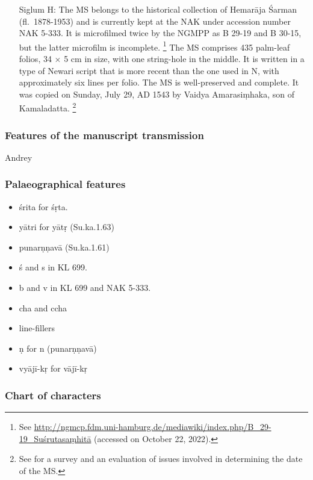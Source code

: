 \begin{itemize}
\item[Siglum H:] The MS belongs to the historical collection of Hemarāja Śarman (fl.\ 1878-1953) and is currently kept at the NAK under accession number NAK 5-333. It is microfilmed twice by the NGMPP as B 29-19 and B 30-15, but the latter microfilm is incomplete.%
    \footnote{%
    See \href{http://ngmcp.fdm.uni-hamburg.de/mediawiki/index.php/B_29-19_Suśrutasaṃhitā}{http://ngmcp.fdm.uni-hamburg.de/mediawiki/index.php/B_29-19_Suśrutasaṃhitā} (accessed on October 22, 2022).
    } 
The MS comprises 435 palm-leaf folios, 34 $\times$ 5 cm in size, with one string-hole in the middle. It is written in a type of Newari script that is more recent than the one used in N, with approximately six lines per folio. The MS is well-preserved and complete. It was copied on Sunday, July 29, AD 1543 by Vaidya Amarasiṃhaka, son of Kamaladatta.%
    \footnote{%
    See \textcites[21--26]{kleb-2021b} for a survey and an evaluation of issues involved in determining the date of the MS.%
    }
\end{itemize}
  
\subsubsection{Features of the manuscript transmission}
Andrey
\subsubsection{Palaeographical features}
\begin{itemize}
    \item śrita for śṛta.
    \item yātri for yātṛ (Su.ka.1.63) %
     \item punarṇṇavā  (Su.ka.1.61) %
    \item ś and s in KL 699.
    \item b and v in KL 699 and NAK 5-333.
    \item cha and ccha
    \item line-fillers
    \item \d n for n (punar\d n\d nav\=a)
    \item vyājī-kṛ for vājī-kṛ
\end{itemize}

\subsubsection{Chart of characters}

